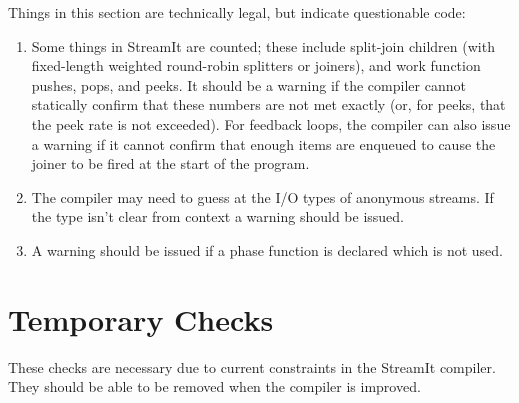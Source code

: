 \documentclass[11pt]{article}
\begin{document}
Things in this section are technically legal, but indicate
questionable code:

\begin{enumerate}
\item Some things in StreamIt are counted; these include split-join
  children (with fixed-length weighted round-robin splitters or
  joiners), and work function pushes, pops, and peeks.  It should be a
  warning if the compiler cannot statically confirm that these numbers
  are not met exactly (or, for peeks, that the peek rate is not
  exceeded).   For feedback loops, the compiler can also issue a
  warning if it cannot confirm that enough items are enqueued to cause
  the joiner to be fired at the start of the program.
\item The compiler may need to guess at the I/O types of anonymous
  streams.  If the type isn't clear from context a warning should be
  issued.
\item A warning should be issued if a phase function is declared which
  is not used.
\end{enumerate}

\section{Temporary Checks}

These checks are necessary due to current constraints in the StreamIt
compiler.  They should be able to be removed when the compiler is
improved.
\end{document}
